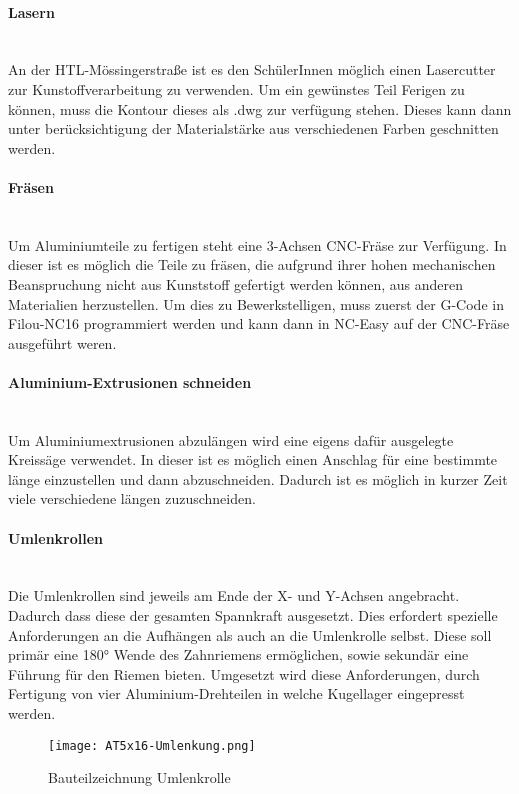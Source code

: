 \paragraph{Lasern}\mbox{}\\
An der HTL-Mössingerstraße ist es den SchülerInnen möglich einen Lasercutter zur Kunstoffverarbeitung zu verwenden. Um ein gewünstes Teil Ferigen zu können, muss die Kontour dieses als .dwg zur verfügung stehen. Dieses kann dann unter berücksichtigung der Materialstärke aus verschiedenen Farben geschnitten werden.


\paragraph{Fräsen}\mbox{}\\
Um Aluminiumteile zu fertigen steht eine 3-Achsen CNC-Fräse zur Verfügung. In dieser ist es möglich die Teile zu fräsen, die aufgrund ihrer hohen mechanischen Beanspruchung nicht aus Kunststoff gefertigt werden können, aus anderen Materialien herzustellen. Um dies zu Bewerkstelligen, muss zuerst der G-Code in Filou-NC16 programmiert werden und kann dann in NC-Easy auf der CNC-Fräse ausgeführt weren.  

\paragraph{Aluminium-Extrusionen schneiden}\mbox{}\\
Um Aluminiumextrusionen abzulängen wird eine eigens dafür ausgelegte Kreissäge verwendet. In dieser ist es möglich einen Anschlag für eine bestimmte länge einzustellen und dann abzuschneiden. Dadurch ist es möglich in kurzer Zeit viele verschiedene längen zuzuschneiden. 


\paragraph{Umlenkrollen}\mbox{}\\
Die Umlenkrollen sind jeweils am Ende der X- und Y-Achsen angebracht. Dadurch dass diese der gesamten Spannkraft ausgesetzt. Dies erfordert spezielle Anforderungen an die Aufhängen als auch an die Umlenkrolle selbst. Diese soll primär eine 180° Wende des Zahnriemens ermöglichen, sowie sekundär eine Führung für den Riemen bieten. 
Umgesetzt wird diese Anforderungen, durch Fertigung von vier Aluminium-Drehteilen in welche Kugellager eingepresst werden.

\begin{figure}[H]
    \centering
    \texttt{[image: AT5x16-Umlenkung.png]}
    \caption{Bauteilzeichnung Umlenkrolle}
    \label{UmlenkrolleBTZ}
\end{figure}

